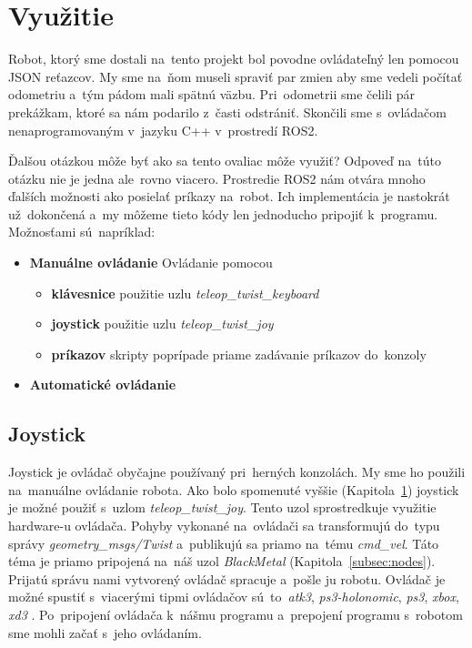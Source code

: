 
\section{Využitie}
\label{sec:vyuzitie}

Robot, ktorý sme dostali na~tento projekt bol povodne ovládateľný len pomocou JSON reťazcov. My sme na~ňom museli spraviť
par zmien aby sme vedeli počítať odometriu a~tým pádom mali spätnú väzbu. Pri~odometrii sme čelili pár prekážkam, ktoré
sa nám podarilo z~časti odstrániť. Skončili sme s~ovládačom nenaprogramovaným v~jazyku C++ v~prostredí ROS2.

Ďalšou otázkou môže byť ako sa tento ovaliac môže využiť? Odpoveď na~túto otázku nie je jedna ale~rovno viacero.
Prostredie ROS2 nám otvára mnoho ďalších možnosti ako posielať príkazy na~robot. Ich implementácia je nastokrát
už~dokončená a~my môžeme tieto kódy len jednoducho pripojiť k~programu. Možnosťami sú~napríklad:

\begin{itemize}
	\item \textbf{Manuálne ovládanie} Ovládanie pomocou
		\begin{itemize}
			\item \textbf{klávesnice} použitie uzlu \textit{teleop\_twist\_keyboard}
			\item \textbf{joystick} použitie uzlu \textit{teleop\_twist\_joy}
			\item \textbf{príkazov} skripty poprípade priame zadávanie príkazov do~konzoly
		\end{itemize}
	\item \textbf{Automatické ovládanie}
\end{itemize}

\subsection{Joystick}
\label{subsec:joystick}

Joystick je ovládač obyčajne používaný pri~herných konzolách. My sme ho použili na~manuálne ovládanie robota. Ako bolo
spomenuté vyššie (Kapitola~\ref{sec:vyuzitie}) joystick je možné použiť s~uzlom \textit{teleop\_twist\_joy}. Tento uzol
sprostredkuje využitie hardware-u ovládača. Pohyby vykonané na~ovládači sa transformujú do~typu správy
\textit{geometry\_msgs/Twist} a~publikujú sa priamo na~tému \textit{cmd\_vel}. Táto téma je priamo pripojená
na~náš uzol \textit{BlackMetal} (Kapitola~\ref{subsec:nodes}). Prijatú správu nami vytvorený ovládač spracuje a~pošle
ju robotu. Ovládač je možné spustiť s~viacerými tipmi ovládačov sú~to~\textit{atk3}, \textit{ps3-holonomic},
\textit{ps3}, \textit{xbox}, \textit{xd3} \cite{teleopjoy}. Po~pripojení ovládača k~nášmu programu a~prepojení
programu s~robotom sme mohli začať s~jeho ovládaním.

